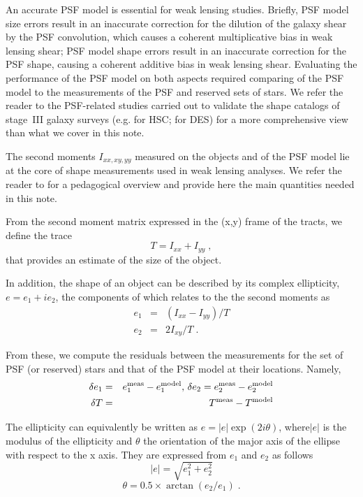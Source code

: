 \documentclass[SE,lsstdraft,authoryear,toc]{lsstdoc}
\begin{document}
An accurate PSF model is essential for weak lensing studies. Briefly, PSF model size errors result in an inaccurate correction for the dilution of the galaxy shear by the PSF convolution, which causes a coherent multiplicative bias in weak lensing shear; PSF model shape errors result in an inaccurate correction for the PSF shape, causing a coherent additive bias in weak lensing shear. Evaluating the performance of the PSF model on both aspects required comparing of the PSF model to the measurements of the PSF and reserved sets of stars. We refer the reader to the PSF-related studies carried out to validate the shape catalogs of stage~III galaxy surveys (e.g. \citealp{2018PASJ...70S..25M, 2022PASJ...74..421L} for HSC; \citealp{2016MNRAS.460.2245J, 2018MNRAS.481.1149Z, 2021MNRAS.504.4312G} for DES) for a more comprehensive view than what we cover in this note.

The second moments $I_{xx,xy,yy}$ measured on the objects and of the PSF model lie at the core of shape measurements used in weak lensing analyses. We refer the reader to \citet{2014ApJS..212....5M} for a pedagogical overview and provide here the main quantities needed in this note.   

From the second moment matrix expressed in the (x,y) frame of the tracts, we define the trace 
\begin{equation}
T = I_{xx} + I_{yy}\;,
\end{equation}
that provides an estimate of the size of the object.

In addition, the shape of an object can be described by its complex ellipticity, $e=e_1+i e_2$, the components of which relates to the the second moments as
\begin{eqnarray}
  e_1 &=& (I_{xx} - I_{yy})/T \\
  e_2 &=& 2 I_{xy} / T\;.
\end{eqnarray}

From these, we compute the residuals between the measurements for the set of PSF (or reserved) stars and that of the PSF model at their locations.  Namely,
\begin{eqnarray}
\delta e_1 &=& e_1^{\rm meas} - e_1^{\rm model}, \, \delta e_2 = e_2^{\rm meas} - e_2^{\rm model}\\
\delta T &=& T^{\rm meas} - T^{\rm model} 
\end{eqnarray}

The ellipticity can equivalently be written as $e = |e| \exp(2i\theta)$, where$|e|$ is the modulus of the ellipticity and $\theta$ the orientation of the major axis of the ellipse with respect to the x axis. They are expressed from $e_1$ and $e_2$ as follows
\begin{equation} 
|e| = \sqrt{e_1^2 + e_2^2}
\label{eq:modulus}
\end{equation}
\begin{equation}
\theta = 0.5 \times \arctan(e_2/e_1)\;.
\label{eq:theta}
\end{equation}
\end{document}
